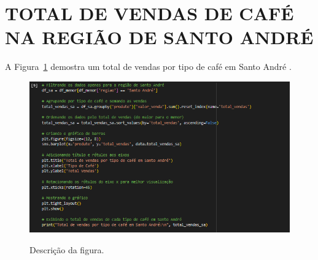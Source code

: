 \section{TOTAL DE VENDAS DE CAFÉ NA REGIÃO DE SANTO ANDRÉ}
	\label{sec:identificao}
\label{sec:figura}
A Figura~\ref{figuras/configuraçao-mais-vendidos-Santo-André.png} demostra um total de vendas por tipo de café em Santo André .
\begin{figure}[!ht]
	{\centering
		\caption{Descrição da figura.}
		\includegraphics[width=1.0\textwidth]{figuras/configuraçao-mais-vendidos-Santo-André.png}
		\label{figuras/configuraçao-mais-vendidos-Santo-André.png}
	}
\end{figure} \\ \\ \\ \\ \\ \\ \\  \\ \\ \\ \\ \\ \\ \\ \\ \\

